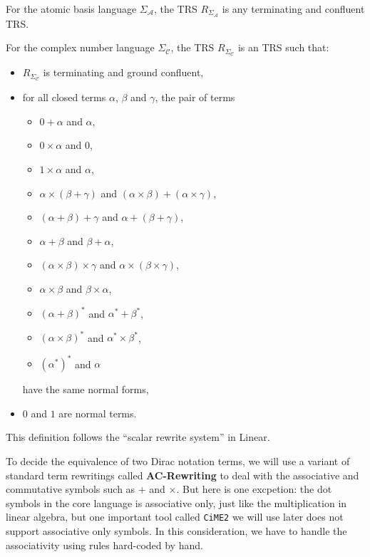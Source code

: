 \documentclass[manuscript, review, timestamp]{acmart}
\begin{document}
\begin{definition}
  For the atomic basis language $\Sigma_\mathcal{A}$, the TRS $R_{\Sigma_\mathcal{A}}$ is any terminating and confluent TRS.
\end{definition}


\begin{definition}
  For the complex number language $\Sigma_\mathcal{C}$, the TRS $R_{\Sigma_\mathcal{C}}$ is an TRS such that:
  \begin{itemize}
    \item $R_{\Sigma_\mathcal{C}}$ is terminating and ground confluent,
    \item for all closed terms $\alpha$, $\beta$ and $\gamma$, the pair of terms
    \begin{itemize}
        \item $0 + \alpha$ and $\alpha$,
        \item $0 \times \alpha$ and $0$,
        \item $1 \times \alpha$ and $\alpha$,
        \item $\alpha \times (\beta + \gamma)$ and $(\alpha \times \beta) + (\alpha \times \gamma)$,
        \item $(\alpha + \beta) + \gamma$ and $\alpha + (\beta + \gamma)$,
        \item $\alpha + \beta$ and $\beta + \alpha$,
        \item $(\alpha \times \beta) \times \gamma$ and $\alpha \times (\beta \times \gamma)$,
        \item $\alpha \times \beta$ and $\beta \times \alpha$,
        \item $(\alpha + \beta)^*$ and $\alpha^* + \beta^*$,
        \item $(\alpha \times \beta)^*$ and $\alpha^* \times \beta^*$,
        \item $(\alpha^*)^*$ and $\alpha$
    \end{itemize}
    have the same normal forms,
    \item $0$ and $1$ are normal terms.
  \end{itemize}  
\end{definition}

This definition follows the ``scalar rewrite system'' in Linear\cite{Arrighi2017}.


To decide the equivalence of two Dirac notation terms, we will use a variant of standard term rewritings called \textbf{AC-Rewriting} to deal with the associative and commutative symbols such as $+$ and $\times$. 
But here is one excpetion: the dot symbols in the core language is associative only, just like the multiplication in linear algebra, but one important tool called \texttt{CiME2} we will use later does not support associative only symbols. In this consideration, we have to handle the associativity using rules hard-coded by hand.
\end{document}
